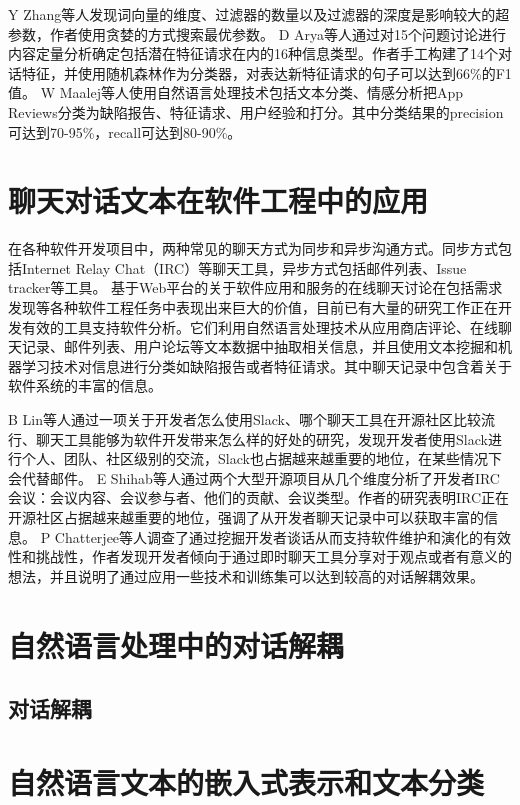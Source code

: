 Y Zhang等人\cite{zhang2015sensitivity}发现词向量的维度、过滤器的数量以及过滤器的深度是影响较大的超参数，作者使用贪婪的方式搜索最优参数。
D Arya等人\cite{arya2019analysis}通过对15个问题讨论进行内容定量分析确定包括潜在特征请求在内的16种信息类型。作者手工构建了14个对话特征，并使用随机森林作为分类器，对表达新特征请求的句子可以达到66\%的F1值。
W Maalej等人\cite{maalej2015bug}使用自然语言处理技术包括文本分类、情感分析把App Reviews分类为缺陷报告、特征请求、用户经验和打分。其中分类结果的precision可达到70-95\%，recall可达到80-90\%。
\section{聊天对话文本在软件工程中的应用}
在各种软件开发项目中，两种常见的聊天方式为同步和异步沟通方式\cite{yu2011communications}。同步方式包括Internet Relay Chat（IRC）等聊天工具，异步方式包括邮件列表、Issue tracker等工具。
基于Web平台的关于软件应用和服务的在线聊天讨论在包括需求发现等各种软件工程任务中表现出来巨大的价值\cite{Morales2019Speech}，目前已有大量的研究工作正在开发有效的工具支持软件分析。它们利用自然语言处理技术从应用商店评论、在线聊天记录、邮件列表、用户论坛等文本数据中抽取相关信息，并且使用文本挖掘和机器学习技术对信息进行分类如缺陷报告或者特征请求。其中聊天记录中包含着关于软件系统的丰富的信息。

B Lin等人\cite{lin2016developers}通过一项关于开发者怎么使用Slack、哪个聊天工具在开源社区比较流行、聊天工具能够为软件开发带来怎么样的好处的研究，发现开发者使用Slack进行个人、团队、社区级别的交流，Slack也占据越来越重要的地位，在某些情况下会代替邮件。
E Shihab等人\cite{shihab2009studying}通过两个大型开源项目从几个维度分析了开发者IRC会议：会议内容、会议参与者、他们的贡献、会议类型。作者的研究表明IRC正在开源社区占据越来越重要的地位，强调了从开发者聊天记录中可以获取丰富的信息。
P Chatterjee等人\cite{chatterjee2019exploratory}调查了通过挖掘开发者谈话从而支持软件维护和演化的有效性和挑战性，作者发现开发者倾向于通过即时聊天工具分享对于观点或者有意义的想法，并且说明了通过应用一些技术和训练集可以达到较高的对话解耦效果。

\section{自然语言处理中的对话解耦}
\subsection{对话解耦}


\section{自然语言文本的嵌入式表示和文本分类}
